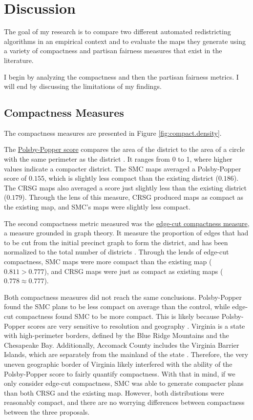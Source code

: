 \section{Discussion}
\label{sec:disc}

The goal of my research is to compare two different automated redistricting algorithms in an empirical context and to evaluate the maps they generate using a variety of compactness and partisan fairness measures that exist in the literature. 

I begin by analyzing the compactness and then the partisan fairness metrics. I will end by discussing the limitations of my findings. 

\subsection{Compactness Measures}

The compactness measures are presented in Figure \ref{fig:compact.density}. 

The \hyperref[sec:polsbypopper]{Polsby-Popper score} compares the area of the district to the area of a circle with the same perimeter as the district \parencite{polsby1991}. It ranges from 0 to 1, where higher values indicate a compacter district. The SMC maps averaged a Polsby-Popper score of $0.155$, which is slightly less compact than the existing district ($0.186$). The CRSG maps also averaged a score just slightly less than the existing district ($0.179$). Through the lens of this measure, CRSG produced maps as compact as the existing map, and SMC's maps were slightly less compact. 

The second compactness metric measured was the \hyperref[sec:edgecut]{edge-cut compactness measure}, a measure grounded in graph theory. It measure the proportion of edges that had to be cut from the initial precinct graph to form the district, and has been normalized to the total number of districts \parencite{dube2016}. Through the lends of edge-cut compactness, SMC maps were more compact than the existing map ($0.811 > 0.777$), and CRSG maps were just as compact as existing maps ($0.778 \approx 0.777$). 

Both compactness measures did not reach the same conclusions. Polsby-Popper found the SMC plans to be less compact on average than the control, while edge-cut compactness found SMC to be more compact. This is likely because Polsby-Popper scores are very sensitive to resolution and geography \parencite{mccartan2020}. Virginia is a state with high-perimeter borders, defined by the Blue Ridge Mountains and the Chesapeake Bay. Additionally, Accomack County includes the Virginia Barrier Islands, which are separately from the mainland of the state \parencite{unitedstatesgeologicalsurvey2021}. Therefore, the very uneven geographic border of Virginia likely interfered with the ability of the Polsby-Popper score to fairly quantify compactness. With that in mind, if we only consider edge-cut compactness, SMC was able to generate compacter plans than both CRSG and the existing map. However, both distributions were reasonably compact, and there are no worrying differences between compactness between the three proposals. 

